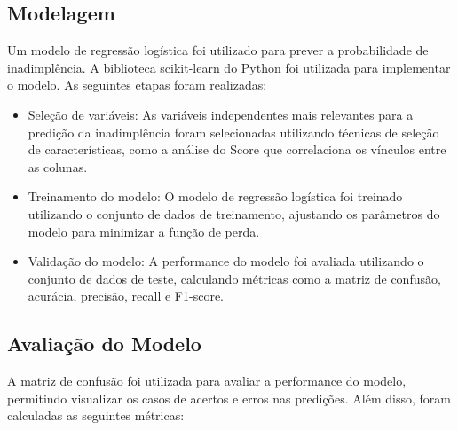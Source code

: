 \documentclass{abntpuc}
\begin{document}
\subsection{Modelagem}
Um modelo de regressão logística foi utilizado para prever a probabilidade de inadimplência. A biblioteca scikit-learn do Python foi utilizada para implementar o modelo. As seguintes etapas foram realizadas:

\begin{itemize}
    \item Seleção de variáveis: As variáveis independentes mais relevantes para a predição da inadimplência foram selecionadas utilizando técnicas de seleção de características, como a análise do Score que correlaciona os vínculos entre as colunas.
    \item Treinamento do modelo: O modelo de regressão logística foi treinado utilizando o conjunto de dados de treinamento, ajustando os parâmetros do modelo para minimizar a função de perda.
    \item Validação do modelo: A performance do modelo foi avaliada utilizando o conjunto de dados de teste, calculando métricas como a matriz de confusão, acurácia, precisão, recall e F1-score.
\end{itemize}

\subsection{Avaliação do Modelo}
A matriz de confusão foi utilizada para avaliar a performance do modelo, permitindo visualizar os casos de acertos e erros nas predições. Além disso, foram calculadas as seguintes métricas:
\end{document}
